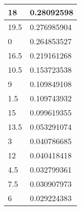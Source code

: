\begin{table}[H]
\begin{tabular}{|l|l|}
		18                                                        & 0.28092598                                                     \\ \hline
		\rowcolor[HTML]{F8FF00} 
		19.5                                                      & 0.276985904                                                    \\ \hline
		\rowcolor[HTML]{F8FF00} 
		0                                                         & 0.264853527                                                    \\ \hline
		\rowcolor[HTML]{F8FF00} 
		16.5                                                      & 0.219161268                                                    \\ \hline
		\rowcolor[HTML]{32CB00} 
		10.5                                                      & 0.153723538                                                    \\ \hline
		\rowcolor[HTML]{32CB00} 
		9                                                         & 0.109849108                                                    \\ \hline
		\rowcolor[HTML]{32CB00} 
		1.5                                                       & 0.109743932                                                    \\ \hline
		\rowcolor[HTML]{32CB00} 
		15                                                        & 0.099619355                                                    \\ \hline
		\rowcolor[HTML]{32CB00} 
		13.5                                                      & 0.053291074                                                    \\ \hline
		\rowcolor[HTML]{32CB00} 
		3                                                         & 0.040786685                                                    \\ \hline
		\rowcolor[HTML]{32CB00} 
		12                                                        & 0.040418418                                                    \\ \hline
		\rowcolor[HTML]{32CB00} 
		4.5                                                       & 0.032799361                                                    \\ \hline
		\rowcolor[HTML]{32CB00} 
		7.5                                                       & 0.030907973                                                    \\ \hline
		\rowcolor[HTML]{32CB00} 
		6                                                         & 0.029224383                                                    \\ \hline
	\end{tabular}
\end{table}


